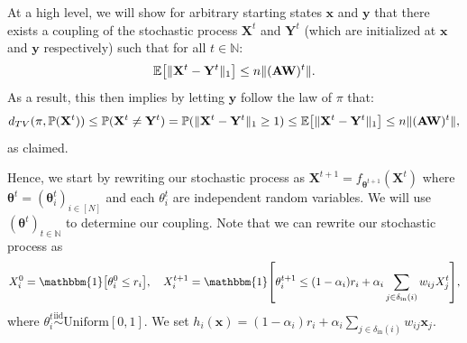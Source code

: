 \documentclass[mnsc,nonblindrev]{informs3}
\newcommand{\NN}{\mathbb{N}}
\newcommand{\Exp}[1]{\mathbb E \left[ #1 \right]} %
\renewcommand{\Pr}{\mathbb{P}}
\newcommand{\din}{\delta_{\text{in}}}
\newcommand{\Xvec}{\mathbf{X}}
\newcommand{\thetavec}{\mathbf{\theta}}
\newcommand{\xvec}{\mathbf{x}}
\newcommand{\Yvec}{\mathbf{Y}}
\newcommand{\yvec}{\mathbf{y}}
\newcommand{\A}{\mathbf{A}}
\newcommand{\W}{\mathbf{W}}
\DeclarePairedDelimiter{\norm}{\lVert}{\rVert}
\let\originalleft\left
\let\originalright\right
\renewcommand{\left}{\mathopen{}\mathclose\bgroup\originalleft}
\renewcommand{\right}{\aftergroup\egroup\originalright}
\renewenvironment{proof}[1][Proof]{%
  \par\noindent{\itshape #1.} \ignorespaces
}{%
  \hfill\Halmos\par
}
\begin{document}
\begin{proof}
At a high level, we will show for arbitrary starting states $\xvec$ and $\yvec$ that there exists a coupling of the stochastic process $\Xvec^t$ and $\Yvec^t$ (which are initialized at $\xvec$ and $\yvec$ respectively) such that for all $t \in \NN$:
\[
\Exp{\norm{\Xvec^t - \Yvec^t}_1} \leq n \norm{(\A\W)^t}.
\]
As a result, this then implies by letting $\yvec$ follow the law of $\pi$ that:
\begin{equation}
\label{eq:tv_bound_l1_norm}
d_{TV}(\pi, \Pr(\Xvec^t)) \leq \Pr(\Xvec^t \neq \Yvec^t) = \Pr(\norm{\Xvec^t - \Yvec^t}_1 \geq 1) \leq \Exp{\norm{\Xvec^t - \Yvec^t}_1} \leq n \norm{(\A\W)^t},
\end{equation}
as claimed.

Hence, we start by rewriting our stochastic process as $\Xvec^{t+1} = f_{\thetavec^{t+1}}(\Xvec^t)$ where $\thetavec^{t} = (\thetavec_i^{t})_{i \in [N]}$ and each $\theta_i^{t}$ are independent random variables.  We will use $(\thetavec^t)_{t \in \NN}$ to determine our coupling.  Note that we can rewrite our stochastic process as
\[
    X_i^0 = \mathbbm{1} \left[ \theta_i^0 \leq r_i \right], \quad
    X_i^{t+1} = \mathbbm{1} \left[ \theta_i^{t+1} \leq (1 - \alpha_i) r_i + \alpha_i \sum_{j \in \din(i)} w_{ij} X_j^{t} \right],
\]
where \( \theta_i^t \overset{\text{iid}}{\sim} \text{Uniform}[0,1] \). We set $h_i(\xvec) = (1 - \alpha_i)r_i + \alpha_i \sum_{j \in \din(i)} w_{ij} \xvec_j$. 


\end{proof}
\end{document}
